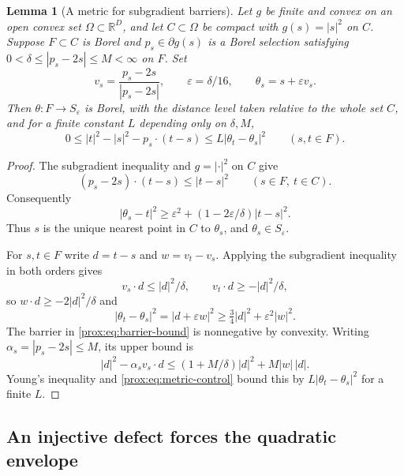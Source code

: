 \documentclass[11pt,letterpaper]{amsart}
\newtheorem{lemma}[theorem]{Lemma}
\theoremstyle{definition}
\theoremstyle{remark}
\numberwithin{equation}{section}
\begin{document}
\begin{lemma}[A metric for subgradient barriers]\label{prox:lem:metric}
Let $g$ be finite and convex on an open convex set
$\Omega\subset\mathbb R^D$, and let $C\subset\Omega$ be compact
with $g(s)=|s|^2$ on $C$. Suppose $F\subset C$ is Borel and
$p_s\in\partial g(s)$ is a Borel selection satisfying
$0<\delta\le|p_s-2s|\le M<\infty$ on $F$.
Set
\[
 v_s=\frac{p_s-2s}{|p_s-2s|},\qquad
 \varepsilon=\delta/16,\qquad \theta_s=s+\varepsilon v_s.
\]
Then $\theta:F\to S_\varepsilon$ is Borel, with the distance
level taken relative to the whole set $C$, and for a finite
constant $L$ depending only on $\delta,M$,
\begin{equation}\label{prox:eq:barrier-bound}
 0\le|t|^2-|s|^2-p_s\cdot(t-s)
       \le L|\theta_t-\theta_s|^2\qquad(s,t\in F).
\end{equation}
\end{lemma}
\begin{proof}
The subgradient inequality and $g=|\cdot|^2$ on $C$ give
\[
 (p_s-2s)\cdot(t-s)\le|t-s|^2\qquad(s\in F,\ t\in C).
\]
Consequently
\[
 |\theta_s-t|^2\ge\varepsilon^2+
       (1-2\varepsilon/\delta)|t-s|^2.
\]
Thus $s$ is the unique nearest point in $C$ to $\theta_s$, and
$\theta_s\in S_\varepsilon$.

For $s,t\in F$ write $d=t-s$ and $w=v_t-v_s$.
Applying the subgradient inequality in both orders gives
\[
 v_s\cdot d\le|d|^2/\delta,\qquad
 v_t\cdot d\ge-|d|^2/\delta,
\]
so $w\cdot d\ge-2|d|^2/\delta$ and
\begin{equation}\label{prox:eq:metric-control}
 |\theta_t-\theta_s|^2
 =|d+\varepsilon w|^2
 \ge\tfrac34|d|^2+\varepsilon^2|w|^2.
\end{equation}
The barrier in \eqref{prox:eq:barrier-bound} is nonnegative by
convexity. Writing $\alpha_s=|p_s-2s|\le M$, its upper bound is
\[
 |d|^2-\alpha_s v_s\cdot d
 \le(1+M/\delta)|d|^2+M|w|\,|d|.
\]
Young's inequality and \eqref{prox:eq:metric-control} bound this
by $L|\theta_t-\theta_s|^2$ for a finite $L$.
\end{proof}

\subsection{An injective defect forces the quadratic envelope}
\end{document}
